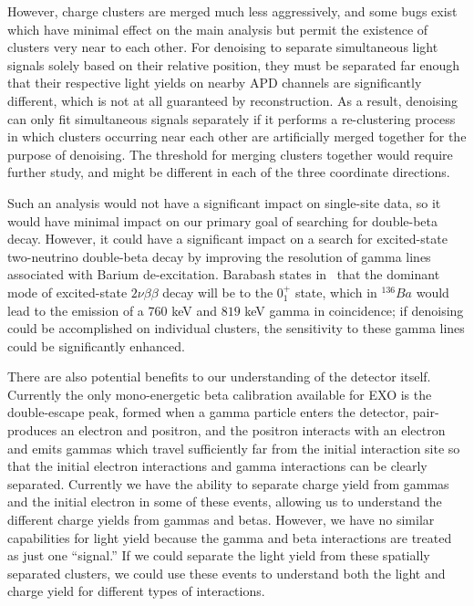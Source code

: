 However, charge clusters are merged much less aggressively, and some bugs exist which have minimal effect on the main analysis but permit the existence of clusters very near to each other.  For denoising to separate simultaneous light signals solely based on their relative position, they must be separated far enough that their respective light yields on nearby APD channels are significantly different, which is not at all guaranteed by reconstruction.  As a result, denoising can only fit simultaneous signals separately if it performs a re-clustering process in which clusters occurring near each other are artificially merged together for the purpose of denoising.  The threshold for merging clusters together would require further study, and might be different in each of the three coordinate directions.

Such an analysis would not have a significant impact on single-site data, so it would have minimal impact on our primary goal of searching for double-beta decay.  However, it could have a significant impact on a search for excited-state two-neutrino double-beta decay by improving the resolution of gamma lines associated with Barium de-excitation.  Barabash states in~\cite{Barabash2010} that the dominant mode of excited-state $2\nu \beta\beta$ decay will be to the $0^{+}_1$ state, which in $^{136}Ba$ would lead to the emission of a $760$ keV and $819$ keV gamma in coincidence; if denoising could be accomplished on individual clusters, the sensitivity to these gamma lines could be significantly enhanced.

There are also potential benefits to our understanding of the detector itself.  Currently the only mono-energetic beta calibration available for EXO is the double-escape peak, formed when a gamma particle enters the detector, pair-produces an electron and positron, and the positron interacts with an electron and emits gammas which travel sufficiently far from the initial interaction site so that the initial electron interactions and gamma interactions can be clearly separated.  Currently we have the ability to separate charge yield from gammas and the initial electron in some of these events, allowing us to understand the different charge yields from gammas and betas.  However, we have no similar capabilities for light yield because the gamma and beta interactions are treated as just one ``signal.''  If we could separate the light yield from these spatially separated clusters, we could use these events to understand both the light and charge yield for different types of interactions.

